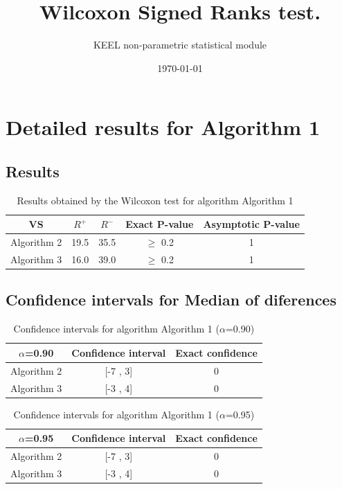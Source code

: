 \documentclass[a4paper,10pt]{article}
\title{Wilcoxon Signed Ranks test.}
\date{\today}
\author{KEEL non-parametric statistical module}
\begin{document}
\pagestyle{empty}
\maketitle
\thispagestyle{empty}



\section{Detailed results for Algorithm 1}


\subsection{Results}

\begin{table}[!htp]
\centering\small
\begin{tabular}{
|c|c|c|c|c|}
\hline
 VS & $R^{+}$ & $R^{-}$ & Exact P-value & Asymptotic P-value \\ \hline 
Algorithm 2 & 19.5 & 35.5 & $\geq$ 0.2 & 1\\ \hline 
Algorithm 3 & 16.0 & 39.0 & $\geq$ 0.2 & 1\\ \hline 

\end{tabular}
\caption{Results obtained by the Wilcoxon test for algorithm Algorithm 1}
\end{table}

\subsection{Confidence intervals for Median of diferences}

\begin{table}[!htp]
\centering\small
\begin{tabular}{
|c|c|c|}
\hline
 $\alpha$=0.90 & Confidence interval & Exact confidence \\ \hline 
Algorithm 2 & [-7 , 3] & 0\\ \hline 
Algorithm 3 & [-3 , 4] & 0\\ \hline 

\end{tabular}
\caption{Confidence intervals for algorithm Algorithm 1 ($\alpha$=0.90)}
\end{table}
\begin{table}[!htp]
\centering\small
\begin{tabular}{
|c|c|c|}
\hline
 $\alpha$=0.95 & Confidence interval & Exact confidence \\ \hline 
Algorithm 2 & [-7 , 3] & 0\\ \hline 
Algorithm 3 & [-3 , 4] & 0\\ \hline 

\end{tabular}
\caption{Confidence intervals for algorithm Algorithm 1 ($\alpha$=0.95)}
\end{table}
\end{document}
